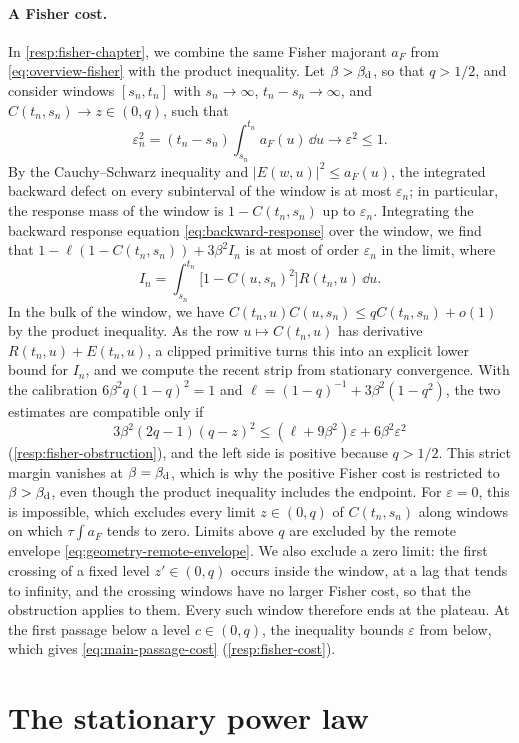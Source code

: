 \paragraph{A Fisher cost.}
In \cref{resp:fisher-chapter}, we combine the same Fisher majorant $a_F$ from \eqref{eq:overview-fisher} with the product inequality. Let $\beta>\beta_{\mathrm d}$, so that $q>1/2$, and consider windows $[s_n,t_n]$ with $s_n\to\infty$, $t_n-s_n\to\infty$, and $C(t_n,s_n)\to z\in(0,q)$, such that
\[
 \varepsilon_n^2=(t_n-s_n)\int_{s_n}^{t_n}a_F(u)\,\dd u\longrightarrow\varepsilon^2\le1 .
\]
By the Cauchy--Schwarz inequality and $|E(w,u)|^2\le a_F(u)$, the integrated backward defect on every subinterval of the window is at most $\varepsilon_n$; in particular, the response mass of the window is $1-C(t_n,s_n)$ up to $\varepsilon_n$. Integrating the backward response equation \eqref{eq:backward-response} over the window, we find that $1-\ell(1-C(t_n,s_n))+3\beta^2I_n$ is at most of order $\varepsilon_n$ in the limit, where
\[
 I_n=\int_{s_n}^{t_n}\bigl[1-C(u,s_n)^2\bigr]R(t_n,u)\,\dd u .
\]
In the bulk of the window, we have $C(t_n,u)C(u,s_n)\le qC(t_n,s_n)+o(1)$ by the product inequality. As the row $u\mapsto C(t_n,u)$ has derivative $R(t_n,u)+E(t_n,u)$, a clipped primitive turns this into an explicit lower bound for $I_n$, and we compute the recent strip from stationary convergence. With the calibration $6\beta^2q(1-q)^2=1$ and $\ell=(1-q)^{-1}+3\beta^2(1-q^2)$, the two estimates are compatible only if
\[
 3\beta^2(2q-1)(q-z)^2\le(\ell+9\beta^2)\varepsilon+6\beta^2\varepsilon^2
\]
(\cref{resp:fisher-obstruction}), and the left side is positive because $q>1/2$. This strict margin vanishes at $\beta=\beta_{\mathrm d}$, which is why the positive Fisher cost is restricted to $\beta>\beta_{\mathrm d}$, even though the product inequality includes the endpoint. For $\varepsilon=0$, this is impossible, which excludes every limit $z\in(0,q)$ of $C(t_n,s_n)$ along windows on which $\tau\int a_F$ tends to zero. Limits above $q$ are excluded by the remote envelope \eqref{eq:geometry-remote-envelope}. We also exclude a zero limit: the first crossing of a fixed level $z'\in(0,q)$ occurs inside the window, at a lag that tends to infinity, and the crossing windows have no larger Fisher cost, so that the obstruction applies to them. Every such window therefore ends at the plateau. At the first passage below a level $c\in(0,q)$, the inequality bounds $\varepsilon$ from below, which gives \eqref{eq:main-passage-cost} (\cref{resp:fisher-cost}).

\section{The stationary power law}\label{sec:overview-power-law}

